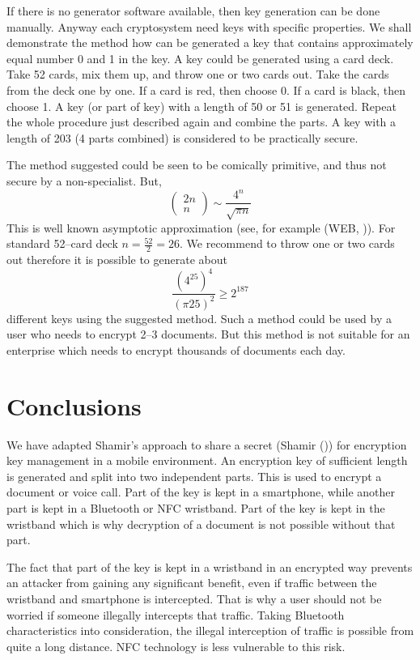 \documentclass{bjmc}
\begin{document}
If there is no generator software available, then key generation can be done
manually.
 Anyway each cryptosystem need keys with specific
properties. We shall demonstrate the method how can be generated a key that contains approximately equal number 0 and 1 in the key.
 A key could be generated using a card deck. Take 52 cards, mix them up, and
throw one or two cards out. Take the cards from the deck one by one. If a card is red, then choose 0.
If a card is black, then choose 1.
A key (or part of key) with a length of 50 or 51 is generated. Repeat the whole procedure just described again and combine the parts. A key with a length of 203 
(4 parts combined) is considered to be practically secure.


The method suggested could be seen to be comically primitive, and thus not secure by a non-specialist. But, 
\[
\left(\begin{array}{c}
2n\\ n
\end{array}\right) \sim\frac{4^n}{\sqrt{\pi n}}
\]
This is well known  asymptotic approximation (see, for example  (WEB,  \cite{Wik})).   
For standard 52--card deck $n=\frac{52}{2}=26$.
We recommend to throw one or two cards out  therefore  it is possible to generate about 
\[
\frac{(4^{25})^4}{(\pi 25)^2}\ge 2^{187}
\]
different keys using the suggested method.  Such a method could be used by a user who needs to encrypt 2--3 documents. 
But this method is not suitable for an enterprise which needs to encrypt  thousands of documents each day.


\section{Conclusions}

We have adapted Shamir's approach to share a secret (Shamir (\cite{Sha})) for encryption key management in a mobile environment.
An encryption key of sufficient length is generated and split into two independent parts. This is used to encrypt a document or voice call. Part of the key is kept in a smartphone, 
while another part is kept in a Bluetooth or NFC wristband. Part of the key is kept in the wristband 
which is why decryption of a document is not possible without that part.

The fact that part of the key is kept in a wristband in an encrypted way prevents an attacker from gaining  any significant benefit, even if traffic between the wristband and 
smartphone is intercepted. That is why a user should not be worried if someone illegally intercepts that traffic. Taking Bluetooth characteristics into consideration,
the illegal interception of traffic is possible from  quite a long distance. NFC technology is less vulnerable to this risk.
\end{document}
